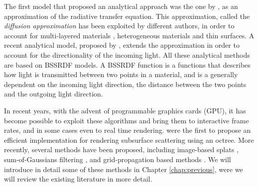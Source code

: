 The first model that proposed an analytical approach was the one by \cite{Jensen:2001:PMS:383259.383319}, as an approximation of the radiative transfer equation. This approximation, called the \emph{diffusion approximation} \citep{books/daglib/0093591} has been exploited by different authors, in order to account for multi-layered materials \citep{Donner:2005:LDM:1186822.1073308}, heterogeneous materials \citep{journals/cgf/WangWHSYG10} and thin surfaces\citep{journals/cgf/WangWHSYG10}. A recent analytical model, proposed by \cite{IMM2013-06646}, extends the approximation in order to account for the directionality of the incoming light. All these analytical methods are based on BSSRDF models. A BSSRDF function is a functions that describes how light is transmitted between two points in a material, and is a generally dependent on the incoming light direction, the distance between the two points and the outgoing light direction.

In recent years, with the advent of programmable graphics cards (GPU), it has become possible to exploit these algorithms and bring them to interactive frame rates, and in some cases even to real time rendering. \cite{Jensen:2002:RHR:566654.566619} were the first to propose an efficient implementation for rendering subsurface scattering using an octree. More recently, several methods have been proposed, including image-based splats \citep{4736459}, sum-of-Gaussians filtering \citep{d'Eon:2007:ERH:2383847.2383869}, and grid-propagation based methods \citep{Borlum:2011:SSL:2018323.2018325}. We will introduce in detail some of these methods in Chapter \ref{chap:previous}, were we will review the existing literature in more detail.

